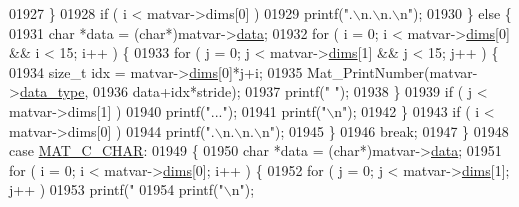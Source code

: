 \begin{DoxyCode}
{{{{{{{{{{{{{{{{{{{{{{{{{{{{{{{{{{{{{{{{01927                     \}
01928                     \textcolor{keywordflow}{if} ( i < matvar->dims[0] )
01929                         printf(\textcolor{stringliteral}{".\(\backslash\)n.\(\backslash\)n.\(\backslash\)n"});
01930                \} \textcolor{keywordflow}{else} \{
01931                    \textcolor{keywordtype}{char} *data = (\textcolor{keywordtype}{char}*)matvar->\hyperlink{group___m_a_t_a5672978efa230bbdecdf38ede781f7fa}{data};
01932                    for ( i = 0; i < matvar->\hyperlink{group___m_a_t_a8e01234e1c862ce3472bb37f5a09b92c}{dims}[0] && i < 15; i++ ) \{
01933                         \textcolor{keywordflow}{for} ( j = 0; j < matvar->\hyperlink{group___m_a_t_a8e01234e1c862ce3472bb37f5a09b92c}{dims}[1] && j < 15; j++ ) \{
01934                             \textcolor{keywordtype}{size\_t} idx = matvar->\hyperlink{group___m_a_t_a8e01234e1c862ce3472bb37f5a09b92c}{dims}[0]*j+i;
01935                             Mat\_PrintNumber(matvar->\hyperlink{group___m_a_t_ab6aafe9bd77f0f077852593dec438144}{data\_type},
01936                                             data+idx*stride);
01937                             printf(\textcolor{stringliteral}{" "});
01938                         \}
01939                         \textcolor{keywordflow}{if} ( j < matvar->dims[1] )
01940                             printf(\textcolor{stringliteral}{"..."});
01941                         printf(\textcolor{stringliteral}{"\(\backslash\)n"});
01942                     \}
01943                     \textcolor{keywordflow}{if} ( i < matvar->dims[0] )
01944                         printf(\textcolor{stringliteral}{".\(\backslash\)n.\(\backslash\)n.\(\backslash\)n"});
01945                 \}
01946                 \textcolor{keywordflow}{break};
01947             \}
01948             \textcolor{keywordflow}{case} \hyperlink{group___m_a_t_ggad4d60ae7b709fc81bfd744fb4c857c40aacdec5834df0861130b393697646119c}{MAT\_C\_CHAR}:
01949             \{
01950                 \textcolor{keywordtype}{char} *data = (\textcolor{keywordtype}{char}*)matvar->\hyperlink{group___m_a_t_a5672978efa230bbdecdf38ede781f7fa}{data};
01951                 for ( i = 0; i < matvar->\hyperlink{group___m_a_t_a8e01234e1c862ce3472bb37f5a09b92c}{dims}[0]; i++ ) \{
01952                     \textcolor{keywordflow}{for} ( j = 0; j < matvar->\hyperlink{group___m_a_t_a8e01234e1c862ce3472bb37f5a09b92c}{dims}[1]; j++ )
01953                         printf(\textcolor{stringliteral}{"%
01954                     printf(\textcolor{stringliteral}{"\(\backslash\)n"});
}}}}}}}}}}}}}}}}}}}}}}}}}}}}}}}}}}}}}}}}}
\end{DoxyCode}
